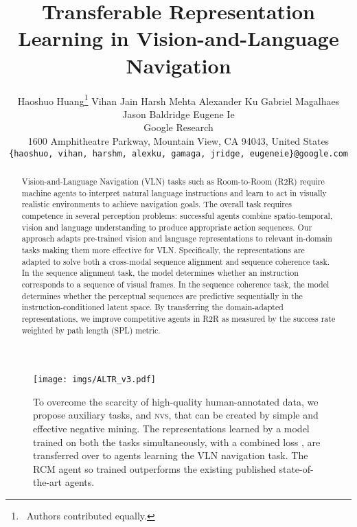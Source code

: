 \documentclass[10pt,twocolumn,letterpaper]{article}
\newcommand{\tasknvs}{\textsc{nvs}}
\begin{document}
\title{Transferable Representation Learning in Vision-and-Language Navigation}

\author{Haoshuo Huang\thanks{\ Authors contributed equally.} \qquad Vihan Jain \footnotemark[\value{footnote}] \qquad Harsh Mehta \qquad Alexander Ku \qquad Gabriel Magalhaes \\ Jason Baldridge \qquad Eugene Ie\\
Google Research\\
1600 Amphitheatre Parkway, Mountain View, CA 94043, United States\\
{\tt\small \{haoshuo, vihan, harshm, alexku, gamaga, jridge, eugeneie\}@google.com}
}

\maketitle
\ificcvfinal\thispagestyle{empty}\fi


\begin{abstract}
Vision-and-Language Navigation (VLN) tasks such as Room-to-Room (R2R) require machine agents to interpret natural language instructions and learn to act in visually realistic environments to achieve navigation goals. The overall task requires competence in several perception problems: successful agents combine spatio-temporal, vision and language understanding to produce appropriate action sequences. Our approach adapts pre-trained vision and language representations to relevant in-domain tasks making them more effective for VLN. Specifically, the representations are adapted to solve both a cross-modal sequence alignment and sequence coherence task. In the sequence alignment task, the model determines whether an instruction corresponds to a sequence of visual frames. In the sequence coherence task, the model determines whether the perceptual sequences are predictive sequentially in the instruction-conditioned latent space. By transferring the domain-adapted representations, we improve competitive agents in R2R as measured by the success rate weighted by path length (SPL) metric.
\end{abstract}


\begin{figure}
  \centering   
  \texttt{[image: imgs/ALTR\_v3.pdf]}


\caption{ 
    To overcome the scarcity of high-quality human-annotated data, we propose auxiliary tasks, {\taskcma} and {\tasknvs}, that can be created by simple and effective negative mining. The representations learned by a model trained on both the tasks simultaneously, with a combined loss , are transferred over to agents learning the VLN navigation task. The RCM agent \cite{Wang:2018:RCM} so trained outperforms the existing published state-of-the-art agents.
    }
    \label{fig:intro_summary}
\end{figure}
\end{document}
